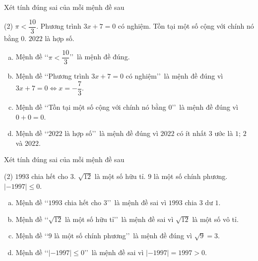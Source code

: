 \begin{bt}%
	Xét tính đúng sai của mỗi mệnh đề sau
	\begin{tasks}(2)
		\task $\pi<\dfrac{10}{3}$.
		\task Phương trình $3x+7=0$ có nghiệm.
		\task Tồn tại một số cộng với chính nó bằng $0$.
		\task $2022$ là hợp số.
	\end{tasks}

	\loigiai
	{
		\begin{enumerate}[a)]
			\item Mệnh đề \lq\lq $\pi<\dfrac{10}{3}$\rq\rq\ là mệnh đề đúng.
			\item Mệnh đề \lq\lq Phương trình $3x+7=0$ có nghiệm\rq\rq\ là mệnh đề đúng vì $3x+7=0 \Leftrightarrow x=-\dfrac{7}{3}$.
			\item Mệnh đề \lq\lq Tồn tại một số cộng với chính nó bằng $0$\rq\rq\ là mệnh đề đúng vì $0+0=0$.
			\item Mệnh đề \lq\lq $2022$ là hợp số\rq\rq\ là mệnh đề đúng vì $2022$ có ít nhất $3$ ước là $1$; $2$ và $2022$.
		\end{enumerate}
	}
\end{bt}

\begin{bt}%
	Xét tính đúng sai của mỗi mệnh đề sau
	\begin{tasks}(2)
		\task $1993$ chia hết cho $3$.
		\task $\sqrt{12}$ là một số hữu tỉ.
		\task $9$ là một số chính phương.
		\task $|-1997|\leqslant0$.
	\end{tasks}
	\loigiai
	{
		\begin{enumerate}[a)]
			\item Mệnh đề \lq\lq $1993$ chia hết cho $3$\rq\rq\ là mệnh đề sai vì $1993$ chia $3$ dư $1$.
			\item Mệnh đề \lq\lq $\sqrt{12}$ là một số hữu tỉ\rq\rq\ là mệnh đề sai vì $\sqrt{12}$ là một số vô tỉ.
			\item Mệnh đề \lq\lq $9$ là một số chính phương\rq\rq\ là mệnh đề đúng vì $\sqrt{9}=3$.
			\item Mệnh đề \lq\lq $|-1997|\leqslant0$\rq\rq\ là mệnh đề sai vì $|-1997|=1997>0$.
		\end{enumerate}
	}
\end{bt}

